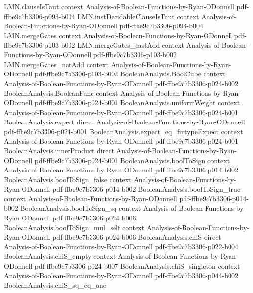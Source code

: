 \begin{theorem}
  {LMN.clauseIsTaut}
  {context}
  {Analysis-of-Boolean-Functions-by-Ryan-ODonnell}
  {pdf-ffbe9c7b3306-p093-b004}
\proofstep
  {LMN.instDecidableClauseIsTaut}
  {context}
  {Analysis-of-Boolean-Functions-by-Ryan-ODonnell}
  {pdf-ffbe9c7b3306-p093-b004}
\proofstep
  {LMN.mergeGates}
  {context}
  {Analysis-of-Boolean-Functions-by-Ryan-ODonnell}
  {pdf-ffbe9c7b3306-p103-b002}
\proofstep
  {LMN.mergeGates_castAdd}
  {context}
  {Analysis-of-Boolean-Functions-by-Ryan-ODonnell}
  {pdf-ffbe9c7b3306-p103-b002}
\proofstep
  {LMN.mergeGates_natAdd}
  {context}
  {Analysis-of-Boolean-Functions-by-Ryan-ODonnell}
  {pdf-ffbe9c7b3306-p103-b002}
\proofstep
  {BooleanAnalysis.BoolCube}
  {context}
  {Analysis-of-Boolean-Functions-by-Ryan-ODonnell}
  {pdf-ffbe9c7b3306-p024-b002}
\proofstep
  {BooleanAnalysis.BooleanFunc}
  {context}
  {Analysis-of-Boolean-Functions-by-Ryan-ODonnell}
  {pdf-ffbe9c7b3306-p024-b001}
\proofstep
  {BooleanAnalysis.uniformWeight}
  {context}
  {Analysis-of-Boolean-Functions-by-Ryan-ODonnell}
  {pdf-ffbe9c7b3306-p024-b001}
\proofstep
  {BooleanAnalysis.expect}
  {direct}
  {Analysis-of-Boolean-Functions-by-Ryan-ODonnell}
  {pdf-ffbe9c7b3306-p024-b001}
\proofstep
  {BooleanAnalysis.expect_eq_fintypeExpect}
  {context}
  {Analysis-of-Boolean-Functions-by-Ryan-ODonnell}
  {pdf-ffbe9c7b3306-p024-b001}
\proofstep
  {BooleanAnalysis.innerProduct}
  {direct}
  {Analysis-of-Boolean-Functions-by-Ryan-ODonnell}
  {pdf-ffbe9c7b3306-p024-b001}
\proofstep
  {BooleanAnalysis.boolToSign}
  {context}
  {Analysis-of-Boolean-Functions-by-Ryan-ODonnell}
  {pdf-ffbe9c7b3306-p014-b002}
\proofstep
  {BooleanAnalysis.boolToSign_false}
  {context}
  {Analysis-of-Boolean-Functions-by-Ryan-ODonnell}
  {pdf-ffbe9c7b3306-p014-b002}
\proofstep
  {BooleanAnalysis.boolToSign_true}
  {context}
  {Analysis-of-Boolean-Functions-by-Ryan-ODonnell}
  {pdf-ffbe9c7b3306-p014-b002}
\proofstep
  {BooleanAnalysis.boolToSign_sq}
  {context}
  {Analysis-of-Boolean-Functions-by-Ryan-ODonnell}
  {pdf-ffbe9c7b3306-p024-b006}
\proofstep
  {BooleanAnalysis.boolToSign_mul_self}
  {context}
  {Analysis-of-Boolean-Functions-by-Ryan-ODonnell}
  {pdf-ffbe9c7b3306-p024-b006}
\proofstep
  {BooleanAnalysis.chiS}
  {direct}
  {Analysis-of-Boolean-Functions-by-Ryan-ODonnell}
  {pdf-ffbe9c7b3306-p022-b004}
\proofstep
  {BooleanAnalysis.chiS_empty}
  {context}
  {Analysis-of-Boolean-Functions-by-Ryan-ODonnell}
  {pdf-ffbe9c7b3306-p024-b007}
\proofstep
  {BooleanAnalysis.chiS_singleton}
  {context}
  {Analysis-of-Boolean-Functions-by-Ryan-ODonnell}
  {pdf-ffbe9c7b3306-p044-b002}
\proofstep
  {BooleanAnalysis.chiS_sq_eq_one}

\end{theorem}
